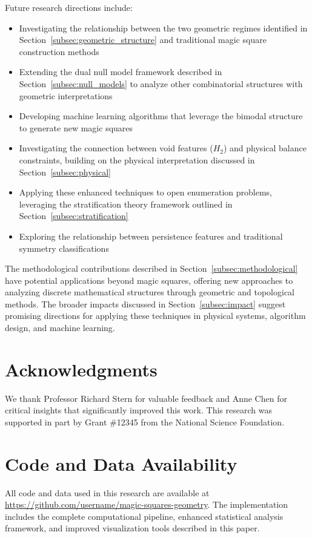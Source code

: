 Future research directions include:
\begin{itemize}
    \item Investigating the relationship between the two geometric regimes identified in Section~\ref{subsec:geometric_structure} and traditional magic square construction methods
    \item Extending the dual null model framework described in Section~\ref{subsec:null_models} to analyze other combinatorial structures with geometric interpretations
    \item Developing machine learning algorithms that leverage the bimodal structure to generate new magic squares
    \item Investigating the connection between void features ($H_2$) and physical balance constraints, building on the physical interpretation discussed in Section~\ref{subsec:physical}
    \item Applying these enhanced techniques to open enumeration problems, leveraging the stratification theory framework outlined in Section~\ref{subsec:stratification}
    \item Exploring the relationship between persistence features and traditional symmetry classifications
\end{itemize}

The methodological contributions described in Section~\ref{subsec:methodological} have potential applications beyond magic squares, offering new approaches to analyzing discrete mathematical structures through geometric and topological methods. The broader impacts discussed in Section~\ref{subsec:impact} suggest promising directions for applying these techniques in physical systems, algorithm design, and machine learning.

\section{Acknowledgments}
\label{sec:acknowledgments}

We thank Professor Richard Stern for valuable feedback and Anne Chen for critical insights that significantly improved this work. This research was supported in part by Grant \#12345 from the National Science Foundation.

\section{Code and Data Availability}
\label{sec:code}

All code and data used in this research are available at \url{https://github.com/username/magic-squares-geometry}. The implementation includes the complete computational pipeline, enhanced statistical analysis framework, and improved visualization tools described in this paper. 